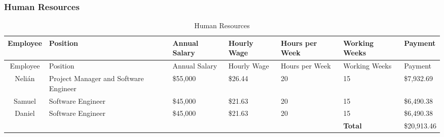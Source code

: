 \subsubsection{Human Resources}
\begin{center}
\setlength{\extrarowheight}{1.5pt}
  \begin{longtable}{|c|p{3.5cm}|p{1.5cm}|p{1cm}|p{1cm}|p{1.5cm}|p{2cm}|}
 \caption{Human Resources} \\
   \hline
  
  \centering Employee & Position & Annual Salary & Hourly Wage & Hours per Week & Working Weeks & Payment \\
  \hline \hline \endfirsthead
  
     \hline

	\centering Employee & Position & Annual Salary & Hourly Wage & Hours per Week & Working Weeks & Payment \\
	\hline \hline \endhead
  
  \endfoot  
    Nelián & Project Manager and Software Engineer & \$55,000  & \$26.44  & 20    & 15    & \$7,932.69  \\ \hline
    Samuel & Software Engineer & \$45,000  & \$21.63  & 20    & 15    & \$6,490.38  \\ \hline
    Daniel & Software Engineer & \$45,000  & \$21.63  & 20    & 15    & \$6,490.38  \\ \hline
    \multicolumn{1}{l}{}      & \multicolumn{1}{l}{}      & \multicolumn{1}{l}{}      & \multicolumn{1}{l}{}      & \multicolumn{1}{l}{}      & \multicolumn{1}{l}{\textbf{Total}} & \multicolumn{1}{l}{\$20,913.46}  \\
          
           \end{longtable}
\end{center}

